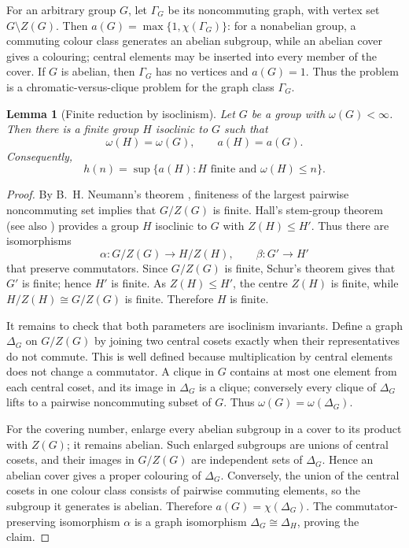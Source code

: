 \documentclass[11pt]{article}
\newtheorem{lemma}[theorem]{Lemma}
\theoremstyle{definition}
\theoremstyle{remark}
\begin{document}
For an arbitrary group $G$, let $\Gamma_G$ be its noncommuting graph, with vertex set $G\setminus Z(G)$. Then $a(G)=\max\{1,\chi(\Gamma_G)\}$: for a nonabelian group, a commuting colour class generates an abelian subgroup, while an abelian cover gives a colouring; central elements may be inserted into every member of the cover. If $G$ is abelian, then $\Gamma_G$ has no vertices and $a(G)=1$. Thus the problem is a chromatic-versus-clique problem for the graph class $\Gamma_G$.

\begin{lemma}[Finite reduction by isoclinism]\label{lem:finite-reduction}
Let $G$ be a group with $\omega(G)<\infty$. Then there is a finite group $H$ isoclinic to $G$ such that
\[
\omega(H)=\omega(G),\qquad a(H)=a(G).
\]
Consequently,
\[
h(n)=\sup\{a(H):H\text{ finite and }\omega(H)\le n\}.
\]
\end{lemma}

\begin{proof}
By B.~H. Neumann's theorem \cite{Neumann1954}, finiteness of the largest pairwise noncommuting set implies that $G/Z(G)$ is finite. Hall's stem-group theorem \cite{Hall1940} (see also \cite[Proposition 3.2]{PournakiSobhani2008}) provides a group $H$ isoclinic to $G$ with $Z(H)\le H'$. Thus there are isomorphisms
\[
\alpha:G/Z(G)\longrightarrow H/Z(H),\qquad \beta:G'\longrightarrow H'
\]
that preserve commutators. Since $G/Z(G)$ is finite, Schur's theorem gives that $G'$ is finite; hence $H'$ is finite. As $Z(H)\le H'$, the centre $Z(H)$ is finite, while $H/Z(H)\cong G/Z(G)$ is finite. Therefore $H$ is finite.

It remains to check that both parameters are isoclinism invariants. Define a graph $\Delta_G$ on $G/Z(G)$ by joining two central cosets exactly when their representatives do not commute. This is well defined because multiplication by central elements does not change a commutator. A clique in $G$ contains at most one element from each central coset, and its image in $\Delta_G$ is a clique; conversely every clique of $\Delta_G$ lifts to a pairwise noncommuting subset of $G$. Thus $\omega(G)=\omega(\Delta_G)$.

For the covering number, enlarge every abelian subgroup in a cover to its product with $Z(G)$; it remains abelian. Such enlarged subgroups are unions of central cosets, and their images in $G/Z(G)$ are independent sets of $\Delta_G$. Hence an abelian cover gives a proper colouring of $\Delta_G$. Conversely, the union of the central cosets in one colour class consists of pairwise commuting elements, so the subgroup it generates is abelian. Therefore $a(G)=\chi(\Delta_G)$. The commutator-preserving isomorphism $\alpha$ is a graph isomorphism $\Delta_G\cong\Delta_H$, proving the claim.
\end{proof}
\end{document}
